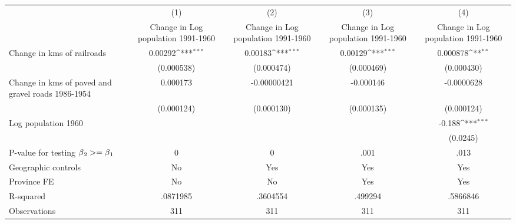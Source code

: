 {
\def\sym#1{\ifmmode^{#1}\else\(^{#1}\)\fi}
\begin{tabular}{l*{4}{c}}
\hline\hline
                &\multicolumn{1}{c}{(1)}&\multicolumn{1}{c}{(2)}&\multicolumn{1}{c}{(3)}&\multicolumn{1}{c}{(4)}\\
                &\multicolumn{1}{c}{Change in Log population 1991-1960}&\multicolumn{1}{c}{Change in Log population 1991-1960}&\multicolumn{1}{c}{Change in Log population 1991-1960}&\multicolumn{1}{c}{Change in Log population 1991-1960}\\
\hline
Change in kms of railroads&  0.00292\sym{***}&  0.00183\sym{***}&  0.00129\sym{***}& 0.000878\sym{**} \\
                &(0.000538)         &(0.000474)         &(0.000469)         &(0.000430)         \\
[1em]
Change in kms of paved and gravel roads 1986-1954& 0.000173         &-0.00000421         &-0.000146         &-0.0000628         \\
                &(0.000124)         &(0.000130)         &(0.000135)         &(0.000124)         \\
[1em]
Log population 1960&                  &                  &                  &   -0.188\sym{***}\\
                &                  &                  &                  & (0.0245)         \\
\hline
P-value for testing $\beta\\_2 >= \beta\\_1$&        0         &        0         &     .001         &     .013         \\
Geographic controls&       No         &      Yes         &      Yes         &      Yes         \\
Province FE     &       No         &       No         &      Yes         &      Yes         \\
R-squared       & .0871985         & .3604554         &  .499294         & .5866846         \\
Observations    &      311         &      311         &      311         &      311         \\
\hline\hline
\end{tabular}
}
